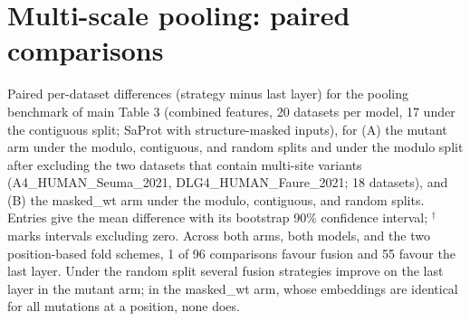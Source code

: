 \documentclass[11pt,a4paper]{article}
\begin{document}
\section*{Multi-scale pooling: paired comparisons}
Paired per-dataset differences (strategy minus last layer) for the pooling benchmark of
main Table 3 (combined features, 20 datasets per model, 17 under the contiguous split;
SaProt with structure-masked inputs), for (A) the mutant arm under the modulo,
contiguous, and random splits and under the modulo split after excluding the two datasets
that contain multi-site variants (A4\_HUMAN\_Seuma\_2021, DLG4\_HUMAN\_Faure\_2021; 18
datasets), and (B) the masked\_wt arm under the modulo, contiguous, and random splits.
Entries give the mean difference with its bootstrap 90\% confidence interval; $^{\dagger}$ marks
intervals excluding zero. Across both arms, both models, and the two position-based fold
schemes, 1 of 96 comparisons favour fusion and 55 favour the last layer. Under the random
split several fusion strategies improve on the last layer in the mutant arm; in the
masked\_wt arm, whose embeddings are identical for all mutations at a position, none
does.
\end{document}
